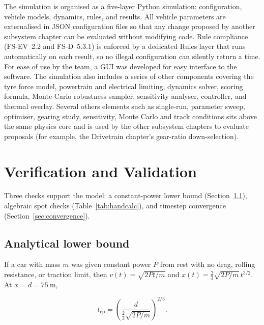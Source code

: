 \documentclass[11pt, a4paper]{report}
\numberwithin{equation}{section}
\begin{document}
\begin{refsection}
The simulation is organised as a five-layer Python simulation:
configuration, vehicle models, dynamics, rules, and results. All
vehicle parameters are externalised in JSON configuration files so
that any change proposed by another subsystem chapter can be
evaluated without modifying code. Rule compliance (FS-EV~2.2 and
FS-D~5.3.1) is enforced by a dedicated Rules layer that runs
automatically on each result, so no illegal configuration
can silently return a time.
For ease of use by the team, a GUI was developed for easy interface to the software.
The simulation also includes a series of other components
covering the tyre force model, powertrain and electrical limiting,
dynamics solver, scoring formula, Monte-Carlo robustness sampler,
sensitivity analyser, controller, and thermal overlay. Several others elements such as single-run, parameter sweep, optimiser, gearing study,
sensitivity, Monte Carlo and track conditions sits above the same
physics core and is used by the other subsystem chapters to evaluate
proposals (for example, the Drivetrain chapter's gear-ratio down-selection).

\section{Verification and Validation}
\label{sec:vv}

Three checks support the model: a constant-power lower bound
(Section~\ref{sec:analytical_bound}), algebraic spot checks
(Table~\ref{tab:handcalc}), and timestep convergence
(Section~\ref{sec:convergence}).

\subsection{Analytical lower bound}
\label{sec:analytical_bound}

If a car with mass $m$ was given constant power $P$ from rest with no drag,
rolling resistance, or traction limit, then
$v(t) = \sqrt{2Pt/m}$ and
$x(t) = \tfrac{2}{3}\sqrt{2P/m}\,t^{3/2}$. At $x=d=\SI{75}{\metre}$,

\begin{equation}
t_\text{cp} = \left(\frac{d}{\tfrac{2}{3}\sqrt{2P/m}}\right)^{2/3}.
\label{eq:analytical_bound}
\end{equation}


\end{refsection}
\end{document}
